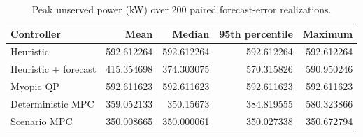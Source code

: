 \begin{table}[t]
\centering
\small
\caption{Peak unserved power (kW) over 200 paired forecast-error realizations.}
\begin{tabular}{lrrrr}
\hline
Controller & Mean & Median & 95th percentile & Maximum \\
\hline
Heuristic & 592.612264 & 592.612264 & 592.612264 & 592.612264 \\
Heuristic + forecast & 415.354698 & 374.303075 & 570.315826 & 590.950246 \\
Myopic QP & 592.611623 & 592.611623 & 592.611623 & 592.611623 \\
Deterministic MPC & 359.052133 & 350.15673 & 384.819555 & 580.323866 \\
Scenario MPC & 350.008665 & 350.000061 & 350.027338 & 350.672794 \\
\hline
\end{tabular}
\end{table}
